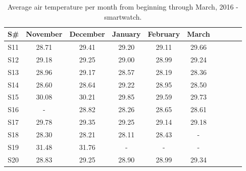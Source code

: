 \documentclass[12pt]{article} %
\begin{document}
\begin{table}[H]
\center
\begin{footnotesize}
	\begin{tabular}{| c | c | c | c | c | c | c | c | c | c |}
	\hline
	\textbf{S\#} & \textbf{November} & \textbf{December} & \textbf{January} & \textbf{February} & \textbf{March} \\
	
	\hline
	S11 & 28.71 & 29.41 & 29.20 & 29.11 & 29.66\\
	\hline
	S12 & 29.18 & 29.25 & 29.00 & 28.99 & 29.24	\\
	\hline
	S13 & 28.96 & 29.17 & 28.57 & 28.19 & 28.36\\
	\hline
	S14 & 28.60 & 28.64 & 29.22 & 28.95 & 28.50\\
	\hline
	S15 & 30.08 & 30.21 & 29.85 & 29.59 & 29.73\\
	\hline
	S16 & - & 28.82 & 28.26 & 28.65 & 28.61\\
	\hline
	S17 & 29.78 & 29.35 & 29.25 & 29.14 & 29.18\\
	\hline
	S18 & 28.30 & 28.21 & 28.11 & 28.43 & - \\
	\hline
	S19 & 31.48 & 31.76 & - & - & -\\
	\hline
	S20 & 28.83 & 29.25 & 28.90 & 28.99 & 29.34\\
	\hline
	\end{tabular}
	\caption{Average air temperature per month from beginning through March, 2016 - smartwatch.}
	\label{tab:airMinutesWatch}
\end{footnotesize}
\end{table}
\end{document}
